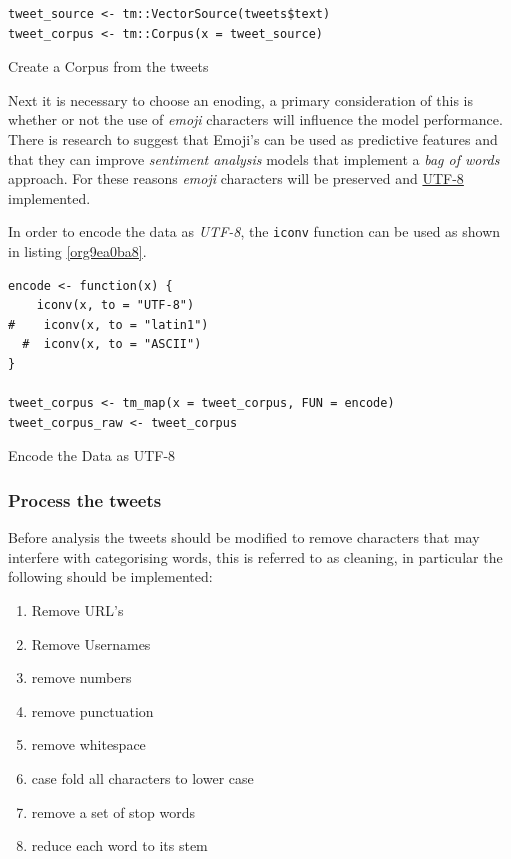 \documentclass[11pt]{article}
\begin{document}
\begin{listing}[htbp]
\begin{verbatim}
tweet_source <- tm::VectorSource(tweets$text)
tweet_corpus <- tm::Corpus(x = tweet_source)
\end{verbatim}
\caption{\label{org245e45c}Create a Corpus from the tweets}
\end{listing}

Next it is necessary to choose an enoding, a primary consideration of this is whether or not the use of \emph{emoji} characters will influence the model performance. There is research to suggest that Emoji's can be used as predictive features \cite{lecompte2017} and that they can improve \emph{sentiment analysis} models \cite{shiha2017} that implement a \emph{bag of words} approach. For these reasons \emph{emoji} characters will be preserved and \href{http://www.utf-8.com/}{UTF-8} implemented.

In order to encode the data as \emph{UTF-8}, the \texttt{iconv} function can be used as shown in listing \ref{org9ea0ba8}.

\begin{listing}[htbp]
\begin{verbatim}
encode <- function(x) {
    iconv(x, to = "UTF-8")
#    iconv(x, to = "latin1")
  #  iconv(x, to = "ASCII")
}

tweet_corpus <- tm_map(x = tweet_corpus, FUN = encode)
tweet_corpus_raw <- tweet_corpus
\end{verbatim}
\caption{\label{org9ea0ba8}Encode the Data as UTF-8}
\end{listing}

\subsubsection{Process the tweets}
\label{sec:org23fcf4b}
Before analysis the tweets should be modified to remove characters that may interfere with categorising words, this is referred to as cleaning, in particular the following should be implemented:

\begin{enumerate}
\item Remove URL's
\item Remove Usernames
\item remove numbers
\item remove punctuation
\item remove whitespace
\item case fold all characters to lower case
\item remove a set of stop words
\item reduce each word to its stem
\end{enumerate}
\end{document}
